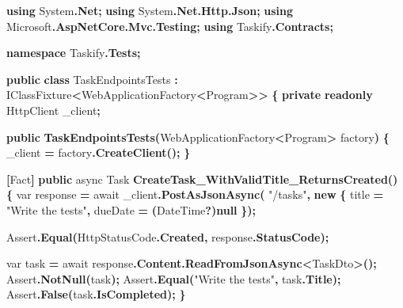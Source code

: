 \documentclass[
  italian,
  10pt,
]{book}
\newenvironment{Shaded}{\begin{snugshade}}{\end{snugshade}}
\newcommand{\DataTypeTok}[1]{\textcolor[rgb]{0.13,0.29,0.53}{#1}}
\newcommand{\FunctionTok}[1]{\textcolor[rgb]{0.13,0.29,0.53}{\textbf{#1}}}
\newcommand{\KeywordTok}[1]{\textcolor[rgb]{0.13,0.29,0.53}{\textbf{#1}}}
\newcommand{\NormalTok}[1]{#1}
\newcommand{\OperatorTok}[1]{\textcolor[rgb]{0.81,0.36,0.00}{\textbf{#1}}}
\newcommand{\StringTok}[1]{\textcolor[rgb]{0.31,0.60,0.02}{#1}}
\begin{document}
\begin{Shaded}
\begin{Highlighting}[]
\KeywordTok{using}\NormalTok{ System}\OperatorTok{.}\FunctionTok{Net}\OperatorTok{;}
\KeywordTok{using}\NormalTok{ System}\OperatorTok{.}\FunctionTok{Net}\OperatorTok{.}\FunctionTok{Http}\OperatorTok{.}\FunctionTok{Json}\OperatorTok{;}
\KeywordTok{using}\NormalTok{ Microsoft}\OperatorTok{.}\FunctionTok{AspNetCore}\OperatorTok{.}\FunctionTok{Mvc}\OperatorTok{.}\FunctionTok{Testing}\OperatorTok{;}
\KeywordTok{using}\NormalTok{ Taskify}\OperatorTok{.}\FunctionTok{Contracts}\OperatorTok{;}

\KeywordTok{namespace}\NormalTok{ Taskify}\OperatorTok{.}\FunctionTok{Tests}\OperatorTok{;}

\KeywordTok{public} \KeywordTok{class}\NormalTok{ TaskEndpointsTests }\OperatorTok{:}\NormalTok{ IClassFixture}\OperatorTok{\textless{}}\NormalTok{WebApplicationFactory}\OperatorTok{\textless{}}\NormalTok{Program}\OperatorTok{\textgreater{}\textgreater{}}
\OperatorTok{\{}
    \KeywordTok{private} \KeywordTok{readonly}\NormalTok{ HttpClient \_client}\OperatorTok{;}

    \KeywordTok{public} \FunctionTok{TaskEndpointsTests}\OperatorTok{(}\NormalTok{WebApplicationFactory}\OperatorTok{\textless{}}\NormalTok{Program}\OperatorTok{\textgreater{}}\NormalTok{ factory}\OperatorTok{)}
    \OperatorTok{\{}
\NormalTok{        \_client }\OperatorTok{=}\NormalTok{ factory}\OperatorTok{.}\FunctionTok{CreateClient}\OperatorTok{();}
    \OperatorTok{\}}

    \OperatorTok{[}\NormalTok{Fact}\OperatorTok{]}
    \KeywordTok{public}\NormalTok{ async Task }\FunctionTok{CreateTask\_WithValidTitle\_ReturnsCreated}\OperatorTok{()}
    \OperatorTok{\{}
        \DataTypeTok{var}\NormalTok{ response }\OperatorTok{=}\NormalTok{ await \_client}\OperatorTok{.}\FunctionTok{PostAsJsonAsync}\OperatorTok{(}
            \StringTok{"/tasks"}\OperatorTok{,} \KeywordTok{new} \OperatorTok{\{}\NormalTok{ title }\OperatorTok{=} \StringTok{"Write the tests"}\OperatorTok{,}\NormalTok{ dueDate }\OperatorTok{=} \OperatorTok{(}\NormalTok{DateTime}\OperatorTok{?)}\KeywordTok{null} \OperatorTok{\});}

\NormalTok{        Assert}\OperatorTok{.}\FunctionTok{Equal}\OperatorTok{(}\NormalTok{HttpStatusCode}\OperatorTok{.}\FunctionTok{Created}\OperatorTok{,}\NormalTok{ response}\OperatorTok{.}\FunctionTok{StatusCode}\OperatorTok{);}

        \DataTypeTok{var}\NormalTok{ task }\OperatorTok{=}\NormalTok{ await response}\OperatorTok{.}\FunctionTok{Content}\OperatorTok{.}\FunctionTok{ReadFromJsonAsync}\OperatorTok{\textless{}}\NormalTok{TaskDto}\OperatorTok{\textgreater{}();}
\NormalTok{        Assert}\OperatorTok{.}\FunctionTok{NotNull}\OperatorTok{(}\NormalTok{task}\OperatorTok{);}
\NormalTok{        Assert}\OperatorTok{.}\FunctionTok{Equal}\OperatorTok{(}\StringTok{"Write the tests"}\OperatorTok{,}\NormalTok{ task}\OperatorTok{.}\FunctionTok{Title}\OperatorTok{);}
\NormalTok{        Assert}\OperatorTok{.}\FunctionTok{False}\OperatorTok{(}\NormalTok{task}\OperatorTok{.}\FunctionTok{IsCompleted}\OperatorTok{);}
    \OperatorTok{\}}


\end{Highlighting}
\end{Shaded}
\end{document}
